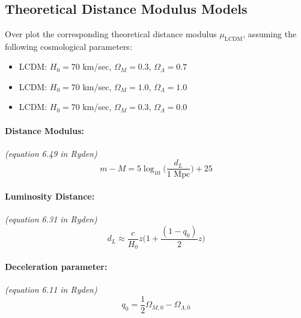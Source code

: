 \documentclass[11pt]{article}
\providecommand{\tightlist}{%
      \setlength{\itemsep}{0pt}\setlength{\parskip}{0pt}}
\begin{document}
    \begin{center}
    \end{center}
    { \hspace*{\fill} \\}
    
    \hypertarget{theoretical-distance-modulus-models}{%
\subsection{Theoretical Distance Modulus
Models}\label{theoretical-distance-modulus-models}}

Over plot the corresponding theoretical distance modulus
\(\mu_{\text{LCDM}}\), assuming the following cosmological parameters:

\begin{itemize}
\tightlist
\item
  LCDM: \(H_0 = 70\) km/sec, \(\Omega_M = 0.3\),
  \(\Omega_\Lambda = 0.7\)
\item
  LCDM: \(H_0 = 70\) km/sec, \(\Omega_M = 1.0\),
  \(\Omega_\Lambda = 1.0\)
\item
  LCDM: \(H_0 = 70\) km/sec, \(\Omega_M = 0.3\),
  \(\Omega_\Lambda = 0.0\)
\end{itemize}

\hypertarget{distance-modulus}{%
\paragraph{Distance Modulus:}\label{distance-modulus}}

\emph{(equation 6.49 in Ryden)} \[
m - M = 5\log_{10}\Big(\frac{d_L}{1 \text{ Mpc}}\Big) + 25
\]

\hypertarget{luminosity-distance}{%
\paragraph{Luminosity Distance:}\label{luminosity-distance}}

\emph{(equation 6.31 in Ryden)} \[
d_L \approx \frac{c}{H_0}z\Big(1+\frac{(1-q_0)}{2}z\Big)
\]

\hypertarget{deceleration-parameter}{%
\paragraph{Deceleration parameter:}\label{deceleration-parameter}}

\emph{(equation 6.11 in Ryden)} \[
q_0 = \frac{1}{2}\Omega_{M,0}-\Omega_{\Lambda,0}
\]
\end{document}
